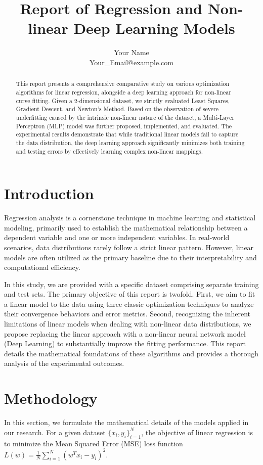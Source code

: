 \documentclass[12pt,a4paper]{article}
\title{\textbf{\Large Report of Regression and Non-linear Deep Learning Models}}
\author{Your Name\\ 
Your\_Email@example.com}
\date{}
\begin{document}
\maketitle 

\begin{abstract}
This report presents a comprehensive comparative study on various optimization algorithms for linear regression, alongside a deep learning approach for non-linear curve fitting. Given a 2-dimensional dataset, we strictly evaluated Least Squares, Gradient Descent, and Newton's Method. Based on the observation of severe underfitting caused by the intrinsic non-linear nature of the dataset, a Multi-Layer Perceptron (MLP) model was further proposed, implemented, and evaluated. The experimental results demonstrate that while traditional linear models fail to capture the data distribution, the deep learning approach significantly minimizes both training and testing errors by effectively learning complex non-linear mappings.
\end{abstract}

\section*{Introduction}
Regression analysis is a cornerstone technique in machine learning and statistical modeling, primarily used to establish the mathematical relationship between a dependent variable and one or more independent variables. In real-world scenarios, data distributions rarely follow a strict linear pattern. However, linear models are often utilized as the primary baseline due to their interpretability and computational efficiency. 

In this study, we are provided with a specific dataset comprising separate training and test sets. The primary objective of this report is twofold. First, we aim to fit a linear model to the data using three classic optimization techniques to analyze their convergence behaviors and error metrics. Second, recognizing the inherent limitations of linear models when dealing with non-linear data distributions, we propose replacing the linear approach with a non-linear neural network model (Deep Learning) to substantially improve the fitting performance. This report details the mathematical foundations of these algorithms and provides a thorough analysis of the experimental outcomes.

\section*{Methodology}
In this section, we formulate the mathematical details of the models applied in our research. For a given dataset $\{x_i, y_i\}_{i=1}^N$, the objective of linear regression is to minimize the Mean Squared Error (MSE) loss function $L(w) = \frac{1}{N} \sum_{i=1}^N (w^T x_i - y_i)^2$. 
\end{document}
